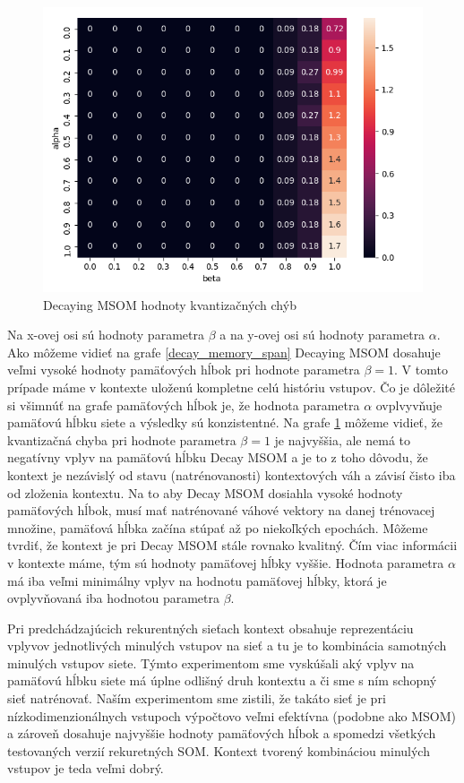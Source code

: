     \begin{figure}[H]
        \centering
        \includegraphics[width=\textwidth]{assets/dm_errors}
        \caption{Decaying MSOM hodnoty kvantizačných chýb}
        \label{decay_errors}
    \end{figure}

    
Na x-ovej osi sú hodnoty parametra $\beta$ a na y-ovej osi sú hodnoty parametra $\alpha$.
Ako môžeme vidieť na grafe \ref{decay_memory_span} Decaying MSOM dosahuje veľmi vysoké hodnoty pamäťových hĺbok pri hodnote 
parametra $\beta = 1$. V tomto prípade máme v kontexte uloženú kompletne celú históriu vstupov. Čo je dôležité si všimnúť na grafe
pamäťových hĺbok je, že hodnota parametra $\alpha$ ovplvyvňuje pamäťovú hĺbku siete a výsledky sú konzistentné.
Na grafe \ref{decay_errors} môžeme vidieť, že kvantizačná chyba pri hodnote parametra $\beta = 1$ je najvyššia, ale nemá to negatívny 
vplyv na pamäťovú hĺbku Decay MSOM a je to z toho dôvodu, že kontext je nezávislý od stavu (natrénovanosti) kontextových váh a závisí čisto iba od zloženia kontextu.
Na to aby Decay MSOM dosiahla vysoké hodnoty pamäťových hĺbok, musí mať natrénované váhové vektory na danej trénovacej množine, pamäťová hĺbka začína stúpať až
po niekoľkých epochách.
Môžeme tvrdiť, že kontext je pri Decay MSOM stále rovnako kvalitný. Čím viac informácii v kontexte máme, tým sú hodnoty pamäťovej hĺbky vyššie.
Hodnota parametra $\alpha$ má iba veľmi minimálny vplyv na hodnotu pamäťovej hĺbky, ktorá je ovplyvňovaná iba hodnotou parametra $\beta$.

Pri predchádzajúcich rekurentných sieťach kontext obsahuje reprezentáciu vplyvov jednotlivých minulých vstupov na sieť a tu je to kombinácia samotných minulých vstupov siete. 
Týmto experimentom sme vyskúšali aký vplyv na pamäťovú hĺbku siete má úplne odlišný druh kontextu a či sme s ním schopný sieť natrénovať.
Naším experimentom sme zistili, že takáto sieť je pri nízkodimenzionálnych vstupoch výpočtovo veľmi efektívna (podobne ako MSOM) a zároveň dosahuje 
najvyššie hodnoty pamäťových hĺbok a spomedzi všetkých testovaných verzií rekuretných SOM.
Kontext tvorený kombináciou minulých vstupov je teda veľmi dobrý.

